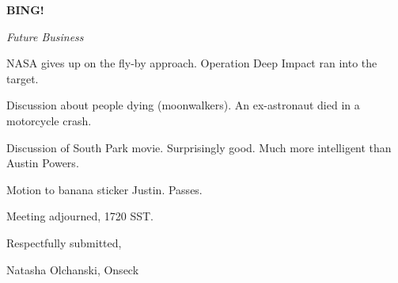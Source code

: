 \documentclass[12pt]{article}
\newcommand{\bing}{{\bf BING!} }
\newcommand{\goto}[1]{\bing \vskip 12pt \centerline{{\em{#1}}}}
\begin{document}
\goto{Future Business}

NASA gives up on the fly-by approach. Operation Deep Impact ran into the target.

Discussion about people dying (moonwalkers). An ex-astronaut died in a motorcycle crash.

Discussion of South Park movie. Surprisingly good. Much more intelligent than Austin Powers.

Motion to banana sticker Justin. Passes.

\vspace{12pt}

\noindent
Meeting adjourned, 1720 SST.

\vspace{18pt}

\centerline{Respectfully submitted,}
\centerline{Natasha Olchanski, Onseck}
\end{document}
